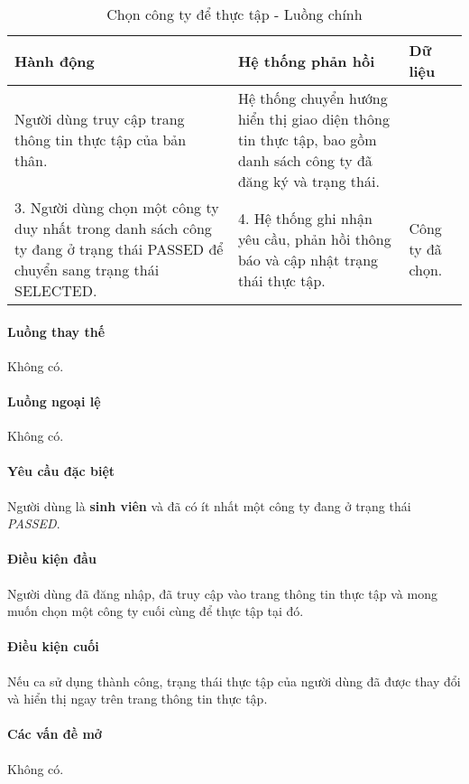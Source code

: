 \documentclass[./../main.tex]{subfiles}
\begin{document}
\begin{table}[H]
  \caption{Chọn công ty để thực tập - Luồng chính}
  \label{tab:select_company}
  \begin{tabularx}{\textwidth}{|X|X|X|}
  \hline
  \textbf{Hành động} &
    \textbf{Hệ thống phản hồi} &
    \textbf{Dữ liệu} \\ \hline
  Người dùng truy cập trang thông tin thực tập của bản thân. &
    Hệ thống chuyển hướng hiển thị giao diện thông tin thực tập, bao gồm danh sách công ty đã đăng ký và trạng thái. &
     \\ \hline
  3. Người dùng chọn một công ty duy nhất trong danh sách công ty đang ở trạng thái PASSED để chuyển sang trạng thái SELECTED. &
    4. Hệ thống ghi nhận yêu cầu, phản hồi thông báo và cập nhật trạng thái thực tập. &
    Công ty đã chọn. \\ \hline
  \end{tabularx}
\end{table}

\paragraph*{Luồng thay thế} Không có.

\paragraph*{Luồng ngoại lệ} Không có.

\paragraph*{Yêu cầu đặc biệt}

Người dùng là \textbf{sinh viên} và đã có ít nhất một công ty đang ở
trạng thái \emph{PASSED}.

\paragraph*{Điều kiện đầu}

Người dùng đã đăng nhập, đã truy cập vào trang thông tin thực tập và
mong muốn chọn một công ty cuối cùng để thực tập tại đó.

\paragraph*{Điều kiện cuối}

Nếu ca sử dụng thành công, trạng thái thực tập của người dùng đã được
thay đổi và hiển thị ngay trên trang thông tin thực tập.

\paragraph*{Các vấn đề mở}

Không có.
\end{document}

